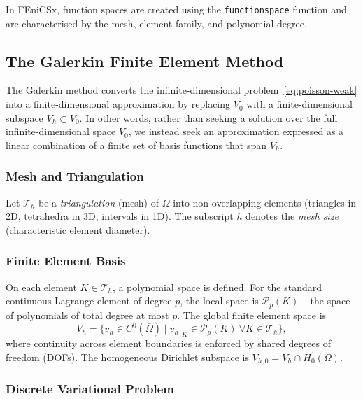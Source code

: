 \documentclass[11pt]{article}
\newcommand{\domain}{\Omega}
\begin{document}
In FEniCSx, function spaces are created using the \texttt{functionspace}
function and are characterised
by the mesh, element family, and polynomial degree.

\subsection{The Galerkin Finite Element Method}

The Galerkin method converts the infinite-dimensional problem~\eqref{eq:poisson-weak}
into a finite-dimensional approximation by replacing $V_0$ with a finite-dimensional
subspace $V_h \subset V_0$. In other words, rather than seeking a solution over
the full infinite-dimensional space $V_0$, we instead seek an approximation
expressed as a linear combination of a finite set of basis functions that span $V_h$.


\subsubsection{Mesh and Triangulation}

Let $\mathcal{T}_h$ be a \emph{triangulation} (mesh) of $\domain$ into
non-overlapping elements (triangles in 2D, tetrahedra in 3D, intervals in 1D).
The subscript $h$ denotes the \emph{mesh size} (characteristic element diameter).

\subsubsection{Finite Element Basis}

On each element $K \in \mathcal{T}_h$, a polynomial space is defined.
For the standard continuous Lagrange element of degree $p$, the local space is
$\mathcal{P}_p(K)$ -- the space of polynomials of total degree at most $p$.
The global finite element space is
\begin{equation*}
  V_h = \bigl\{ v_h \in C^0(\bar\domain)
    \mid v_h|_K \in \mathcal{P}_p(K)\ \forall K \in \mathcal{T}_h \bigr\},
\end{equation*}
where continuity across element boundaries is enforced by shared degrees of
freedom (DOFs).
The homogeneous Dirichlet subspace is
$V_{h,0} = V_h \cap H^1_0(\domain)$.

\subsubsection{Discrete Variational Problem}
\end{document}
